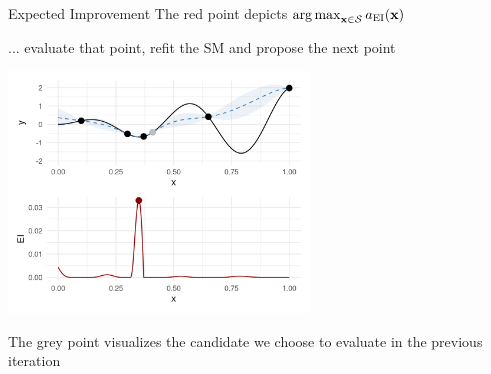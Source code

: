 \documentclass[11pt,compress,t,notes=noshow, xcolor=table]{beamer}
\begin{document}
\begin{vbframe}{Expected Improvement}
The red point depicts $\operatorname{arg\,max}_{\mathbf{x} \in \mathcal{S}} a_{\text{EI}}(\mathbf{x})$

\framebreak

... evaluate that point, refit the SM and propose the next point

\begin{center}
  \includegraphics[width = 0.6\textwidth]{figure_man/bayesian_loop_2.png}
\end{center}

The grey point visualizes the candidate we choose to evaluate in the previous iteration

\end{vbframe}
\end{document}
